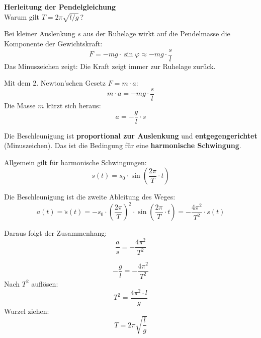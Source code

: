 \documentclass[11pt,a4paper]{scrartcl}
\begin{document}
	
	\begin{center}
		{\LARGE\bfseries Herleitung der Pendelgleichung}\\[0.3cm]
		{\large Warum gilt $T = 2\pi\sqrt{l/g}$\,?}
	\end{center}
	\begin{minipage}[t]{0.58\textwidth}
		
		\begin{schrittbox}[title={\faIcon{shoe-prints} Schritt 1: Rücktreibende Kraft}]
			Bei kleiner Auslenkung $s$ aus der Ruhelage wirkt auf die Pendelmasse die Komponente der Gewichtskraft:
			\[F = -mg \cdot \sin\varphi \approx -mg \cdot \frac{s}{l}\]
			Das Minuszeichen zeigt: Die Kraft zeigt immer zur Ruhelage zurück.
		\end{schrittbox}
		
		\vspace{0.2cm}
		
		\begin{schrittbox}[title={\faIcon{shoe-prints} Schritt 2: Beschleunigung (Newton)}]
			Mit dem 2. Newton'schen Gesetz $F = m \cdot a$:
			\[m \cdot a = -mg \cdot \frac{s}{l}\]
			Die Masse $m$ kürzt sich heraus:
			\[\boxed{a = -\frac{g}{l} \cdot s}\]
		\end{schrittbox}
		
		\vspace{0.2cm}
		
		\begin{schrittbox}[title={\faIcon{shoe-prints} Schritt 3: Harmonische Schwingung erkennen}]
			Die Beschleunigung ist \textbf{proportional zur Auslenkung} und \textbf{entgegengerichtet} (Minuszeichen). Das ist die Bedingung für eine \textbf{harmonische Schwingung}.
			
			Allgemein gilt für harmonische Schwingungen:
			\[s(t) = s_0 \cdot \sin\left(\frac{2\pi}{T} \cdot t\right)\]
			
			Die Beschleunigung ist die zweite Ableitung des Weges:
			\[a(t) = \ddot{s}(t) = -s_0 \cdot \left(\frac{2\pi}{T}\right)^2 \cdot \sin\left(\frac{2\pi}{T} \cdot t\right) = -\frac{4\pi^2}{T^2} \cdot s(t)\]
			
			Daraus folgt der Zusammenhang:
			\[\boxed{\frac{a}{s} = -\frac{4\pi^2}{T^2}}\]
		\end{schrittbox}
		
		\vspace{0.2cm}
		
		\begin{schrittbox}[title={\faIcon{shoe-prints} Schritt 4: Gleichsetzen und Auflösen}]
			\[-\frac{g}{l} = -\frac{4\pi^2}{T^2}\]
			Nach $T^2$ auflösen:
			\[T^2 = \frac{4\pi^2 \cdot l}{g}\]
			Wurzel ziehen:
			\[\boxed{T = 2\pi\sqrt{\frac{l}{g}}}\]
		\end{schrittbox}
		
	\end{minipage}
\end{document}
